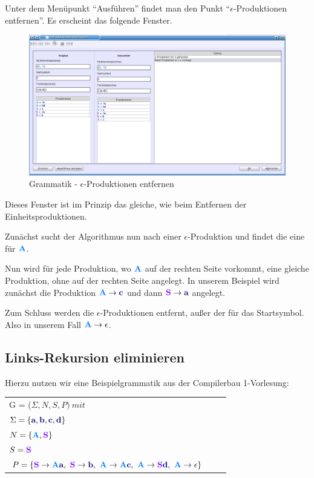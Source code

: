 Unter dem Menüpunkt "`Ausführen"' findet man den Punkt "`$\epsilon$-Produktionen entfernen"'. Es erscheint das folgende Fenster.

\begin{figure}[h]
\begin{center}
\includegraphics[width=12cm]{../images/epsilon_productions.png}
\caption{Grammatik - $\epsilon$-Produktionen entfernen}
\end{center}
\end{figure}

Dieses Fenster ist im Prinzip das gleiche, wie beim Entfernen der Einheitsproduktionen.

Zunächst sucht der Algorithmus nun nach einer $\epsilon$-Produktion und findet die eine für $\NonterminalSymbol{A}$.

Nun wird für jede Produktion, wo $\NonterminalSymbol{A}$ auf der rechten Seite vorkommt, eine gleiche Produktion, ohne  auf der rechten Seite angelegt. In unserem Beispiel wird zunächst die Produktion $\NonterminalSymbol{A} \to \TerminalSymbol{c}$ und dann $\StartSymbol{S} \to \TerminalSymbol{a}$ angelegt.

Zum Schluss werden die $\epsilon$-Produktionen entfernt, außer der für das Startsymbol. Also in unserem Fall $\NonterminalSymbol{A} \to \epsilon$.


\subsection{Links-Rekursion eliminieren}

Hierzu nutzen wir eine Beispielgrammatik aus der Compilerbau 1-Vorlesung:

\begin{tabular}{lcr}
G = ($\Sigma, N, S, P )\ mit $\\
$\Sigma = \{\TerminalSymbol{a}, \TerminalSymbol{b}, \TerminalSymbol{c},
\TerminalSymbol{d}\}$\\ $N =
\{\NonterminalSymbol{A}, \StartSymbol{S}\}$\\ $S=\StartSymbol{S}$\\
$P = \{\StartSymbol{S} \to \NonterminalSymbol{A}\TerminalSymbol{a},\ \StartSymbol{S} \to \TerminalSymbol{b},\
\NonterminalSymbol{A}	\to \NonterminalSymbol{A}\TerminalSymbol{c},\ \NonterminalSymbol{A} \to \StartSymbol{S}\TerminalSymbol{d},\
\NonterminalSymbol{A} \to \epsilon\}$\\
\end{tabular}

